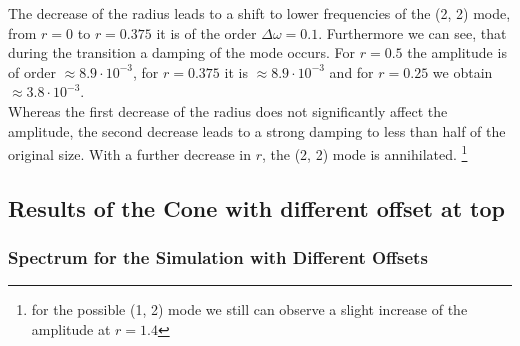 The decrease of the radius leads to a shift to lower frequencies of the (2, 2) mode,
from $r=0$ to $r=0.375$ it is of the order $\Delta \omega=0.1$.
Furthermore we can see, that during the transition a damping of the mode occurs.
For $r=0.5$ the amplitude is of order $\approx8.9\cdot10^{-3}$, for $r=0.375$ it is
$\approx8.9\cdot10^{-3}$ and for $r=0.25$ we obtain $\approx3.8\cdot10^{-3}$.\\
Whereas the first decrease of the radius does not significantly affect the amplitude,
the second decrease leads to a strong damping to less than half of the original size.
With a further decrease in $r$, the (2, 2) mode is annihilated.
\footnote{ for the possible (1, 2) mode we still can observe a slight increase of the amplitude at $r=1.4$}

\clearpage


\subsection{Results of the Cone with different offset at top}
\subsubsection{Spectrum for the Simulation with Different Offsets}

